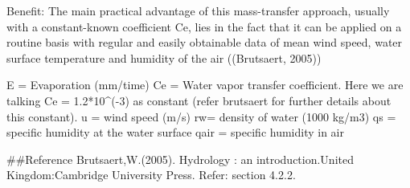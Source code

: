 \documentclass[
]{article}
\newenvironment{Shaded}{\begin{snugshade}}{\end{snugshade}}
\newcommand{\CommentTok}[1]{\textcolor[rgb]{0.56,0.35,0.01}{\textit{#1}}}
\newcommand{\DecValTok}[1]{\textcolor[rgb]{0.00,0.00,0.81}{#1}}
\newcommand{\DocumentationTok}[1]{\textcolor[rgb]{0.56,0.35,0.01}{\textbf{\textit{#1}}}}
\newcommand{\FloatTok}[1]{\textcolor[rgb]{0.00,0.00,0.81}{#1}}
\newcommand{\NormalTok}[1]{#1}
\newcommand{\OtherTok}[1]{\textcolor[rgb]{0.56,0.35,0.01}{#1}}
\newcommand{\SpecialCharTok}[1]{\textcolor[rgb]{0.00,0.00,0.00}{#1}}
\begin{document}
Benefit: The main practical advantage of this mass-transfer approach,
usually with a constant-known coefficient Ce, lies in the fact that it
can be applied on a routine basis with regular and easily obtainable
data of mean wind speed, water surface temperature and humidity of the
air ((Brutsaert, 2005))

E = Evaporation (mm/time) Ce = Water vapor transfer coefficient. Here we
are talking Ce = 1.2*10\^{}(-3) as constant (refer brutsaert for further
details about this constant). u = wind speed (m/s) rw= density of water
(1000 kg/m3) qs = specific humidity at the water surface qair = specific
humidity in air

\#\#Reference Brutsaert,W.(2005). Hydrology : an introduction.United
Kingdom:Cambridge University Press. Refer: section 4.2.2.

\begin{Shaded}
\end{Shaded}
\end{document}
